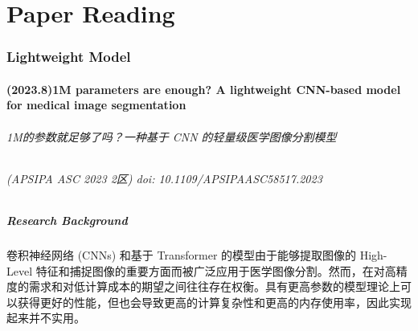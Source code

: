 \documentclass[a4paper, 10pt]{article}
\begin{document}

	
	\part{Paper Reading}
	
	\section{Lightweight Model}
		
		\subsection{(2023.8)1M parameters are enough? A lightweight CNN-based model for medical image segmentation}
		
		\paragraph{1M的参数就足够了吗？一种基于 CNN 的轻量级医学图像分割模型}
		
		\paragraph{(APSIPA ASC 2023 2区) doi: 10.1109/APSIPAASC58517.2023}
		
			\subsubsection{Research Background}
			
			卷积神经网络 (CNNs) 和基于 Transformer 的模型由于能够提取图像的 High-Level 特征和捕捉图像的重要方面而被广泛应用于医学图像分割。然而，在对高精度的需求和对低计算成本的期望之间往往存在权衡。具有更高参数的模型理论上可以获得更好的性能，但也会导致更高的计算复杂性和更高的内存使用率，因此实现起来并不实用。
			
\end{document}
